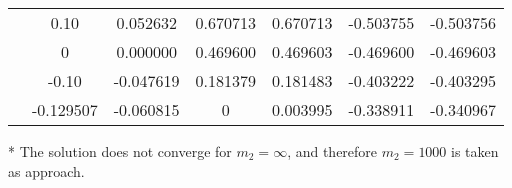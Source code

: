 \begin{threeparttable}
\begin{tabular}{S[table-format=1.2] S[table-format=-1.6] S[table-format=4.6] S[table-format=1.6] S[table-format=1.6] S[table-format=-1.6] S[table-format=-1.6]}
                  &   0.10       &   0.052632            &  0.670713   &  0.670713   &  -0.503755   &  -0.503756  \\
                  &   0       &   0.000000            &  0.469600   &  0.469603   &  -0.469600   &  -0.469603  \\
                  &   -0.10       &   -0.047619            &  0.181379   &  0.181483   &  -0.403222   &  -0.403295  \\
                  &   -0.129507       &   -0.060815            &  0   &  0.003995   &  -0.338911   &  -0.340967  \\
        \bottomrule

    \end{tabular}
    \begin{tablenotes}
        \item[*] The solution does not converge for $m_2 = \infty$, and therefore $m_2 = 1000$ is taken as approach.
    \end{tablenotes}
\end{threeparttable}
